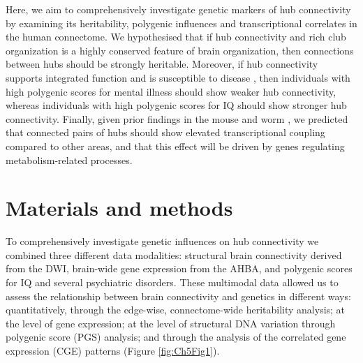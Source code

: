 Here, we aim to comprehensively investigate genetic markers of hub connectivity by examining its heritability, polygenic influences and transcriptional correlates in the human connectome. We hypothesised that if hub connectivity and rich club organization is a highly conserved feature of brain organization, then connections between hubs should be strongly heritable. Moreover, if hub connectivity supports integrated function and is susceptible to disease \citep{Crossley2016a,Fornito2015}, then individuals with high polygenic scores for mental illness should show weaker hub connectivity, whereas individuals with high polygenic scores for IQ should show stronger hub connectivity. Finally, given prior findings in the mouse \citep{Fulcher2016} and worm \citep{Arnatkeviciute2018}, we predicted that connected pairs of hubs should show elevated transcriptional coupling compared to other areas, and that this effect will be driven by genes regulating metabolism-related processes.

\section{Materials and methods}

To comprehensively investigate genetic influences on hub connectivity we combined three different data modalities: structural brain connectivity derived from the DWI, brain-wide gene expression from the AHBA, and polygenic scores for IQ and several psychiatric disorders. These multimodal data allowed us to assess the relationship between brain connectivity and genetics in different ways: quantitatively, through the edge-wise, connectome-wide heritability analysis; at the level of gene expression; at the level of structural DNA variation through polygenic score (PGS) analysis; and through the analysis of the correlated gene expression (CGE) patterns (Figure \ref{fig:Ch5Fig1}).

